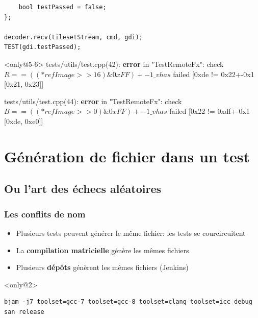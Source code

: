 \documentclass{beamer}
\begin{document}
\begin{frame}[fragile]
\begin{exampleblock}{}
\begin{lstlisting}
    bool testPassed = false;
};

decoder.recv(tilesetStream, cmd, gdi);
TEST(gdi.testPassed);
\end{lstlisting}
\end{exampleblock}

\begin{exampleblock}{}<only@5-6>
{\color{f7}tests/utils/test.cpp(42)}: \textbf{\color{f1}error} in "{\color{f5}TestRemoteFx}":
 {\color{f4}check} {\color{f1}$R == ((*refImage >> 16) \& 0xFF) +- 1\_v has$} failed [{\color{f6}0xde} {\color{f3}!=} {\color{f6}0x22+-0x1 [0x21, 0x23]}]

{\color{f7}tests/utils/test.cpp(44)}: \textbf{\color{f1}error} in "{\color{f5}TestRemoteFx}":
 {\color{f4}check} {\color{f1}$B == ((*refImage >> 0 ) \& 0xFF) +- 1\_v has$} failed [{\color{f6}0x22} {\color{f3}!=} {\color{f6}0xdf+-0x1 [0xde, 0xe0]}]
\end{exampleblock}

\end{frame}


\section{Génération de fichier dans un test}

\subsection{Ou l'art des échecs aléatoires}


\begin{frame}[fragile]
\frametitle{Les conflits de nom}

\begin{itemize}[<+->]
 \item Plusieurs tests peuvent générer le même fichier: les tests se courcircuitent
 \item La \textbf{compilation matricielle} génère les mêmes fichiers
 \item Plusieurs \textbf{dépôts} génèrent les mêmes fichiers (Jenkins)
\end{itemize}

\begin{exampleblock}{}<only@2>
\begin{lstlisting}
bjam -j7 toolset=gcc-7 toolset=gcc-8 toolset=clang toolset=icc debug san release
\end{lstlisting}
\end{exampleblock}

\end{frame}
\end{document}
